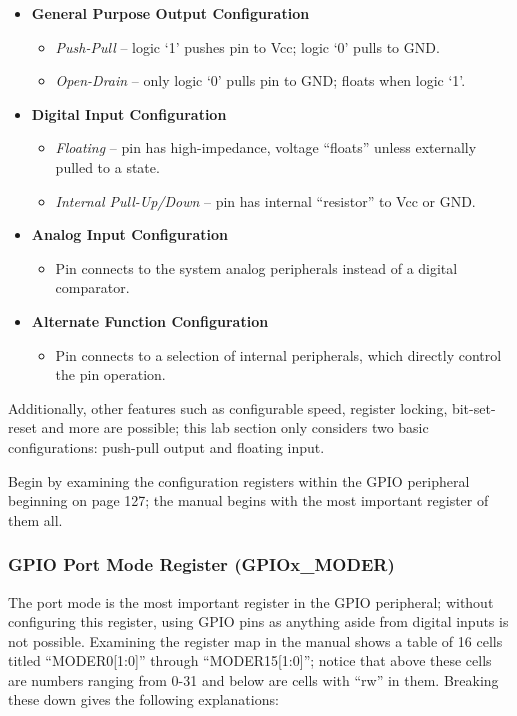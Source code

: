 \documentclass[openany,11pt,fleqn]{book} %
\begin{document}
\begin{itemize}
    \item \textbf{General Purpose Output Configuration}
    \begin{itemize}
        \item \textit{Push-Pull} -- logic `1' pushes pin to Vcc; logic `0' pulls to GND.
        \item \textit{Open-Drain} -- only logic `0' pulls pin to GND; floats when logic `1'.
    \end{itemize}
    \item \textbf{Digital Input Configuration}
    \begin{itemize}
        \item \textit{Floating} -- pin has high-impedance, voltage ``floats'' unless externally pulled to a state.
        \item \textit{Internal Pull-Up/Down} -- pin has internal ``resistor'' to Vcc or GND.
    \end{itemize}
    \item \textbf{Analog Input Configuration}
    \begin{itemize}
        \item Pin connects to the system analog peripherals instead of a digital comparator.
    \end{itemize}
    \item \textbf{Alternate Function Configuration}
    \begin{itemize}
        \item Pin connects to a selection of internal peripherals, which directly control the pin operation.
    \end{itemize}
\end{itemize} 

Additionally, other features such as configurable speed, register locking, bit-set-reset and more are possible; this lab section only considers two basic configurations: push-pull output and floating input.

Begin by examining the configuration registers within the GPIO peripheral beginning on page 127; the manual begins with the most important register of them all. 

\subsubsection{GPIO Port Mode Register (GPIOx\_MODER)}

The port mode is the most important register in the GPIO peripheral; without configuring this register, using GPIO pins as anything aside from digital inputs is not possible. Examining the register map in the manual shows a table of 16 cells titled ``MODER0[1:0]'' through ``MODER15[1:0]''; notice that above these cells are numbers ranging from 0-31 and below are cells with ``rw'' in them. Breaking these down gives the following explanations: 
\end{document}
